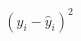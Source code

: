 \documentclass[preview]{standalone}
\begin{document}
\begin{align*}
(y_i - \hat{y}_i)^2
\end{align*}
\end{document}

